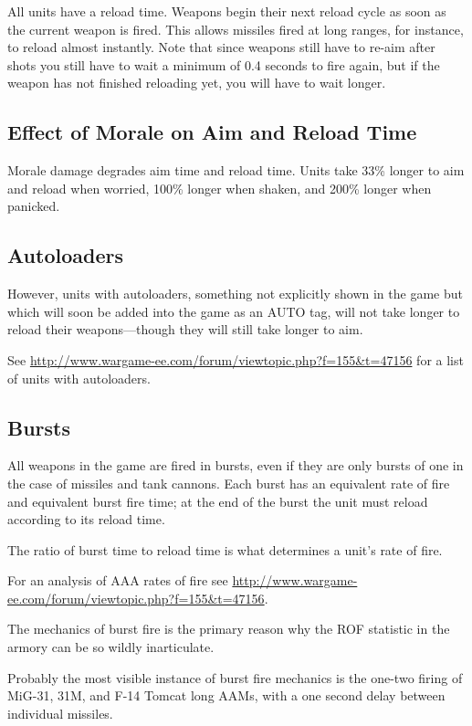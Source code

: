 \documentclass{article}
\begin{document}
All units have a reload time. Weapons begin their next reload cycle as soon as
the current weapon is fired. This allows missiles fired at long ranges, for
instance, to reload almost instantly. Note that since weapons still have to
re-aim after shots you still have to wait a minimum of 0.4 seconds to fire
again, but if the weapon has not finished reloading yet, you will have to wait
longer.

\subsection{Effect of Morale on Aim and Reload Time}

Morale damage degrades aim time and reload time. Units take 33\% longer to aim
and reload when worried, 100\% longer when shaken, and 200\% longer when
panicked.

\subsection{Autoloaders}

However, units with autoloaders, something not explicitly shown in the game
but which will soon be added into the game as an AUTO tag, will not take
longer to reload their weapons---though they will still take longer to aim.

See \url{http://www.wargame-ee.com/forum/viewtopic.php?f=155&t=47156} for a list
of units with autoloaders.

\subsection{Bursts}

All weapons in the game are fired in bursts, even if they are only
bursts of one in the case of missiles and tank cannons. Each burst has an
equivalent rate of fire and equivalent burst fire time; at the end of the burst
the unit must reload according to its reload time.

The ratio of burst time to reload time is what determines a unit's rate of fire.

For an analysis of AAA rates of fire see
\url{http://www.wargame-ee.com/forum/viewtopic.php?f=155&t=47156}.

The mechanics of burst fire is the primary reason why the ROF statistic in the
armory can be so wildly inarticulate.

Probably the most visible instance of burst fire mechanics is the one-two firing
of MiG-31, 31M, and F-14 Tomcat long AAMs, with a one second delay between
individual missiles.
\end{document}
